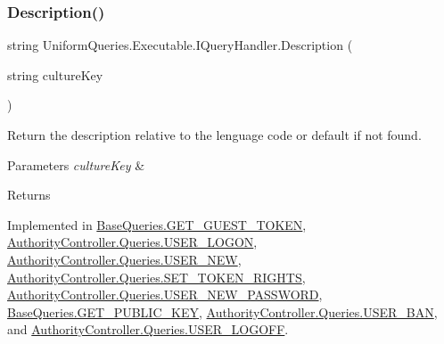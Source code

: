 \subsubsection{\texorpdfstring{Description()}{Description()}}
{\footnotesize\ttfamily string Uniform\+Queries.\+Executable.\+I\+Query\+Handler.\+Description (\begin{DoxyParamCaption}\item[{string}]{culture\+Key }\end{DoxyParamCaption})}



Return the description relative to the lenguage code or default if not found. 


\begin{DoxyParams}{Parameters}
{\em culture\+Key} & \\
\hline
\end{DoxyParams}
\begin{DoxyReturn}{Returns}

\end{DoxyReturn}


Implemented in \mbox{\hyperlink{class_base_queries_1_1_g_e_t___g_u_e_s_t___t_o_k_e_n_a06d62fabd5b44fb6b9975da1b72308a2}{Base\+Queries.\+G\+E\+T\+\_\+\+G\+U\+E\+S\+T\+\_\+\+T\+O\+K\+EN}}, \mbox{\hyperlink{class_authority_controller_1_1_queries_1_1_u_s_e_r___l_o_g_o_n_af448426be46032c3ae103cdf4ea5f40b}{Authority\+Controller.\+Queries.\+U\+S\+E\+R\+\_\+\+L\+O\+G\+ON}}, \mbox{\hyperlink{class_authority_controller_1_1_queries_1_1_u_s_e_r___n_e_w_a16439c165f3ac2ca8b586dd8bfd2bf55}{Authority\+Controller.\+Queries.\+U\+S\+E\+R\+\_\+\+N\+EW}}, \mbox{\hyperlink{class_authority_controller_1_1_queries_1_1_s_e_t___t_o_k_e_n___r_i_g_h_t_s_a149fb8950cf0ebbcb47b6a238c6458d2}{Authority\+Controller.\+Queries.\+S\+E\+T\+\_\+\+T\+O\+K\+E\+N\+\_\+\+R\+I\+G\+H\+TS}}, \mbox{\hyperlink{class_authority_controller_1_1_queries_1_1_u_s_e_r___n_e_w___p_a_s_s_w_o_r_d_a3050d851f7563bb06a3b5dbb7e3496d0}{Authority\+Controller.\+Queries.\+U\+S\+E\+R\+\_\+\+N\+E\+W\+\_\+\+P\+A\+S\+S\+W\+O\+RD}}, \mbox{\hyperlink{class_base_queries_1_1_g_e_t___p_u_b_l_i_c___k_e_y_afcd94e8596f6c015a1a60c987d53cfa8}{Base\+Queries.\+G\+E\+T\+\_\+\+P\+U\+B\+L\+I\+C\+\_\+\+K\+EY}}, \mbox{\hyperlink{class_authority_controller_1_1_queries_1_1_u_s_e_r___b_a_n_ae0fe5998c22cf9fb76b601fbf7ee832e}{Authority\+Controller.\+Queries.\+U\+S\+E\+R\+\_\+\+B\+AN}}, and \mbox{\hyperlink{class_authority_controller_1_1_queries_1_1_u_s_e_r___l_o_g_o_f_f_a2cb738d74699241341b691cc55b57e1d}{Authority\+Controller.\+Queries.\+U\+S\+E\+R\+\_\+\+L\+O\+G\+O\+FF}}.

